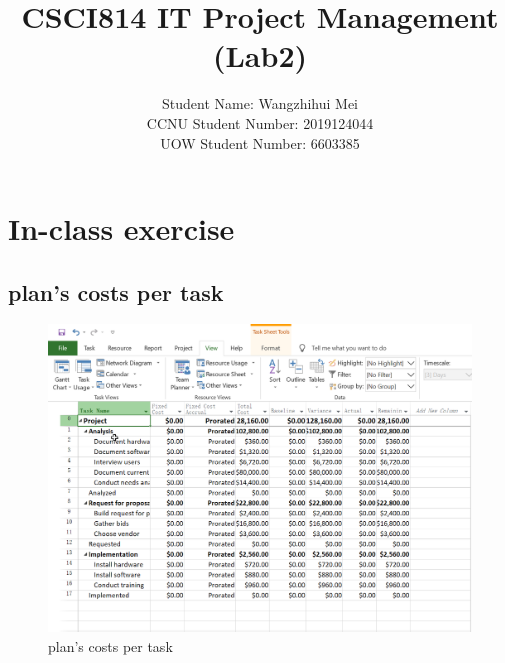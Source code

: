 \documentclass[runningheads]{llncs}
\begin{document}
\title{\large{CSCI814 IT Project Management (Lab2)}}

%
%
\author{\large{Student Name: Wangzhihui Mei \\ %
CCNU Student Number: 2019124044 \\ %
UOW Student Number: 6603385}}  %







\maketitle
\clearpage


\section{In-class exercise}
\subsection{plan's costs per task}
\begin{figure}[H]
    \centering
    \includegraphics[width=1.0\textwidth]{./image/figure1}
    \caption{plan's costs per task}
    \label{}
\end{figure}
\end{document}
